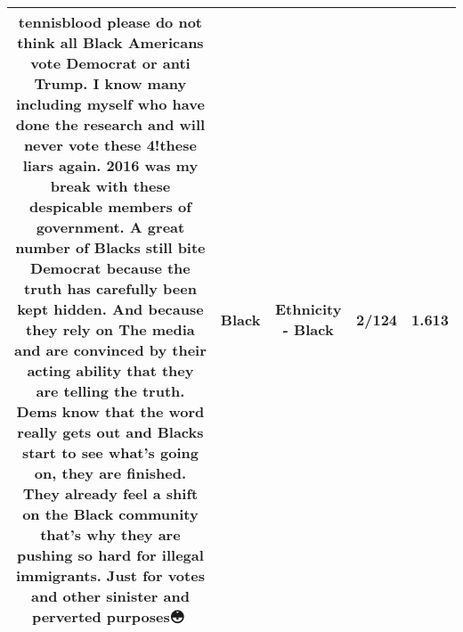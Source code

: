 \documentclass[11pt]{article}
\newlength\mylength
\begin{document}
\begin{center}
\begin{longtable}{|C{.65\mylength}|C{.30\mylength}|C{.12\mylength}|C{.12\mylength}|C{.12\mylength}|}
  \small tennisblood please do not think all \textbf{Black} Americans vote Democrat or anti Trump. I know many including myself who have done the research and will never vote these 4!these liars again. 2016 was my break with these despicable members of government. A great number of Blacks still bite Democrat because the truth has carefully been kept hidden. And because they rely on The media and are convinced by their acting ability that they are telling the truth. Dems know that the word really gets out and Blacks start to see what's going on, they are finished. They already feel a shift on the \textbf{Black} community that's why they are pushing so hard for illegal immigrants. Just for votes and other sinister and perverted purposes😳🤨\normalsize   & Black & Ethnicity - Black & 2/124 & 1.613 \\  \hline

\end{longtable}
\end{center}
\end{document}
